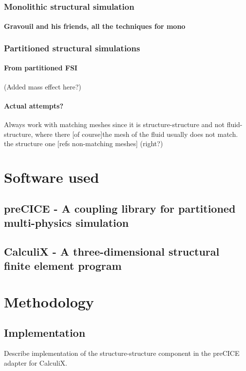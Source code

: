 \documentclass[a4paper, 11pt, oneside]{Thesis}  %
\begin{document}
\subsection{Monolithic structural simulation}
\subsubsection{Gravouil and his friends, all the techniques for mono}
\subsection{Partitioned structural simulations}
\subsubsection{From partitioned FSI}
(Added mass effect here?)
\subsubsection{Actual attempts?}

Always work with matching meshes since it is structure-structure and not fluid-structure, where there [of course]the mesh of the fluid usually does not match. the structure one [refs non-matching meshes] (right?)

\chapter{Software used}

\section{preCICE - A coupling library for partitioned multi-physics simulation}

\section{CalculiX - A three-dimensional structural finite element program}

\chapter{Methodology}
\section{Implementation}

Describe implementation of the structure-structure component in the preCICE adapter for CalculiX.
\end{document}
